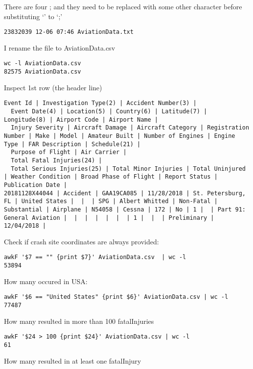 \documentclass{article}
\begin{document}
There are four ; and they need to be replaced with some other character
before substituting `\textbar{}' to `;'

\begin{verbatim}
23832039 12-06 07:46 AviationData.txt
\end{verbatim}

I rename the file to AviationData.csv

\begin{verbatim}
wc -l AviationData.csv 
82575 AviationData.csv
\end{verbatim}

Inspect 1st row (the header line)

\begin{verbatim}
Event Id | Investigation Type(2) | Accident Number(3) | 
  Event Date(4) | Location(5) | Country(6) | Latitude(7) | Longitude(8) | Airport Code | Airport Name | 
  Injury Severity | Aircraft Damage | Aircraft Category | Registration Number | Make | Model | Amateur Built | Number of Engines | Engine Type | FAR Description | Schedule(21) | 
  Purpose of Flight | Air Carrier | 
  Total Fatal Injuries(24) | 
  Total Serious Injuries(25) | Total Minor Injuries | Total Uninjured | Weather Condition | Broad Phase of Flight | Report Status | Publication Date | 
20181128X44044 | Accident | GAA19CA085 | 11/28/2018 | St. Petersburg, FL | United States |  |  | SPG | Albert Whitted | Non-Fatal | Substantial | Airplane | N54058 | Cessna | 172 | No | 1 |  | Part 91: General Aviation |  |  |  |  |  |  | 1 |  |  | Preliminary | 12/04/2018 | 
\end{verbatim}

Check if crash site coordinates are always provided:

\begin{verbatim}
awkF '$7 == "" {print $7}' AviationData.csv  | wc -l
53894
\end{verbatim}

How many occured in USA:

\begin{verbatim}
awkF '$6 == "United States" {print $6}' AviationData.csv | wc -l
77487
\end{verbatim}

How many resulted in more than 100 fatalInjuries

\begin{verbatim}
awkF '$24 > 100 {print $24}' AviationData.csv | wc -l
61
\end{verbatim}

How many resulted in at least one fatalInjury
\end{document}

